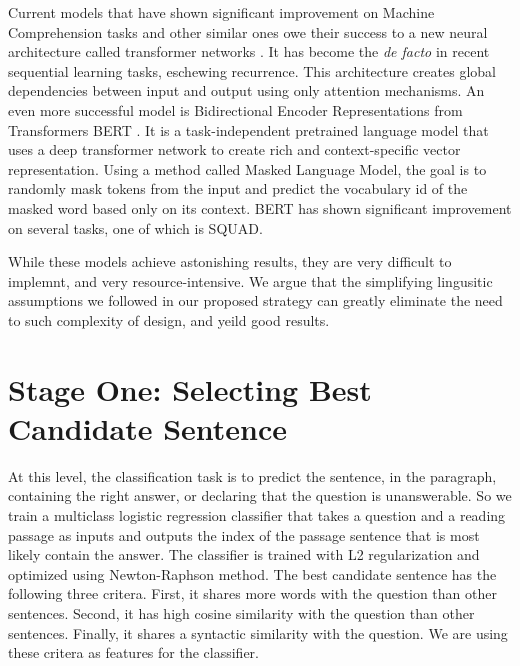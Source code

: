 Current models that have shown significant improvement on Machine Comprehension tasks and other similar ones owe their success to a new neural architecture called transformer networks \citep{DBLP:journals/corr/VaswaniSPUJGKP17}. It has become the \emph{de facto} in recent sequential learning tasks, eschewing recurrence. This architecture creates global dependencies between input and output using only attention mechanisms. An even more successful model is Bidirectional Encoder Representations from Transformers BERT \citep{DBLP:journals/corr/abs-1810-04805}. It is a task-independent pretrained language model that uses a deep transformer network to create rich and context-specific vector representation. Using a method called Masked Language Model, the goal is to randomly mask tokens from the input and predict the vocabulary id of the masked word based only on its context. BERT has shown significant improvement on several tasks, one of which is SQUAD. 

While these models achieve astonishing results, they are very difficult to implemnt, and very resource-intensive. We argue that the simplifying lingusitic assumptions we followed in our proposed strategy can greatly eliminate the need to such complexity of design, and yeild good results. 


\section{Stage One: Selecting Best Candidate Sentence}

At this level, the classification task is to predict the sentence, in the paragraph, containing the right answer, or declaring that the question is unanswerable. So we train a multiclass logistic regression classifier that takes a question and a reading passage as inputs and outputs the index of the passage sentence that is most likely contain the answer. The classifier is trained with L2 regularization and optimized using Newton-Raphson method. The best candidate sentence has the following three critera. First, it shares more words with the question than other sentences. Second, it has high cosine similarity with the question than other sentences. Finally, it shares a syntactic similarity with the question. We are using these critera as features for the classifier. 

